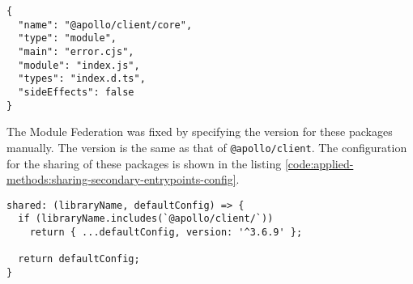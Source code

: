 \ifshowListings
\begin{listing}[H]
  \begin{verbatim}
{
  "name": "@apollo/client/core",
  "type": "module",
  "main": "error.cjs",
  "module": "index.js",
  "types": "index.d.ts",
  "sideEffects": false
}
    \end{verbatim}
    \caption{The \texttt{package.json} of \texttt{@apollo/client/core}.}\label{code:applied-methods:package-json-apollo-client-core}
\end{listing}
\fi

\noindent The Module Federation was fixed by specifying the version for these packages manually. The version is the same as that of \texttt{@apollo/client}. The configuration for the sharing of these packages is shown in the listing \ref{code:applied-methods:sharing-secondary-entrypoints-config}. 

\ifshowListings
\begin{listing}[H]
  \begin{verbatim}
shared: (libraryName, defaultConfig) => {
  if (libraryName.includes(`@apollo/client/`))
    return { ...defaultConfig, version: '^3.6.9' };

  return defaultConfig;
}
    \end{verbatim}
    \caption{Specifying the version for the secondary entry points for the \texttt{@apollo/client} package.}\label{code:applied-methods:sharing-secondary-entrypoints-config}
\end{listing}
\fi

